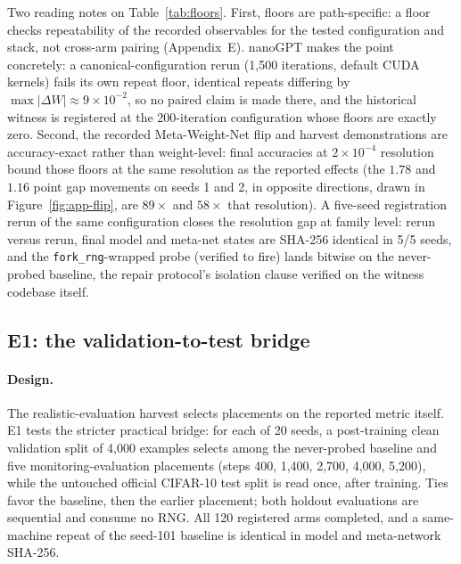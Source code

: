 \documentclass[10pt,letterpaper]{article}
\theoremstyle{remark}
\newcommand{\code}[1]{\texttt{#1}}
\begin{document}
Two reading notes on Table~\ref{tab:floors}. First, floors are
path-specific: a floor checks repeatability of the recorded observables
for the tested configuration and stack, not cross-arm pairing
(Appendix~E). nanoGPT makes the point concretely: a
canonical-configuration rerun (1{,}500 iterations, default CUDA kernels)
fails its own repeat floor, identical repeats differing by
$\max|\Delta W| \approx 9{\times}10^{-2}$, so no paired claim is made
there, and the historical witness is registered at the 200-iteration configuration
whose floors are exactly zero. Second, the recorded Meta-Weight-Net flip
and harvest demonstrations are accuracy-exact rather than weight-level:
final accuracies at $2{\times}10^{-4}$ resolution bound those floors at
the same resolution as the reported effects (the $1.78$ and $1.16$ point
gap movements on seeds 1 and 2, in opposite directions, drawn in
Figure~\ref{fig:app-flip}, are $89\times$ and $58\times$ that resolution). A five-seed registration rerun of the
same configuration closes the resolution gap at family level: rerun
versus rerun, final model and meta-net states are SHA-256 identical in
5/5 seeds, and the \code{fork\_rng}-wrapped probe (verified to fire)
lands bitwise on the never-probed baseline, the repair protocol's
isolation clause verified on the witness codebase itself.

\subsection{E1: the validation-to-test bridge}
\label{sec:e1-bridge}

\paragraph{Design.}
The realistic-evaluation harvest selects placements on the reported metric
itself. E1 tests the stricter practical bridge: for each of 20 seeds, a
post-training clean validation split of 4{,}000 examples selects among the
never-probed baseline and five monitoring-evaluation placements (steps
400, 1{,}400, 2{,}700, 4{,}000, 5{,}200), while the untouched official
CIFAR-10 test split is read once, after training. Ties favor the baseline,
then the earlier placement; both holdout evaluations are sequential and
consume no RNG. All 120 registered arms completed, and a same-machine
repeat of the seed-101 baseline is identical in model and meta-network
SHA-256.
\end{document}
